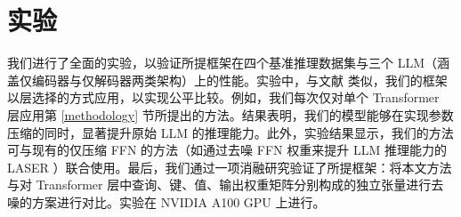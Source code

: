 
\section{实验}
我们进行了全面的实验，以验证所提框架在四个基准推理数据集与三个 LLM（涵盖仅编码器与仅解码器两类架构）上的性能。实验中，与文献 \cite{sharma2023truth} 类似，我们的框架以层选择的方式应用，以实现公平比较。例如，我们每次仅对单个 Transformer 层应用第 \ref{methodology} 节所提出的方法。结果表明，我们的模型能够在实现参数压缩的同时，显著提升原始 LLM 的推理能力。此外，实验结果显示，我们的方法可与现有的仅压缩 FFN 的方法（如通过去噪 FFN 权重来提升 LLM 推理能力的 LASER \cite{sharma2023truth}）联合使用。最后，我们通过一项消融研究验证了所提框架：将本文方法与对 Transformer 层中查询、键、值、输出权重矩阵分别构成的独立张量进行去噪的方案进行对比。实验在 NVIDIA A100 GPU 上进行。

